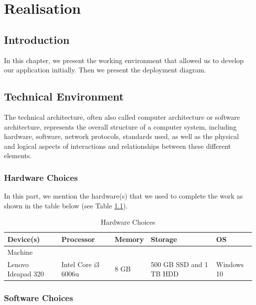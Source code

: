 \chapter{Realisation}
\section{Introduction}

In this chapter, we present the working environment that allowed us to develop our application initially. Then we present the deployment diagram.

\section{Technical Environment}

The technical architecture, often also called computer architecture or software architecture, represents the overall structure of a computer system, including hardware, software, network protocols, standards used, as well as the physical and logical aspects of interactions and relationships between these different elements.

\subsection{Hardware Choices}

In this part, we mention the hardware(s) that we used to complete the work as shown in the table below (see Table \ref{tab:hardware-choices}).
\begin{table}[htbp]
    \centering
    
    \begin{tabular}{|p{2cm}|p{3cm}|p{2cm}|p{4cm}|p{2cm}|}
        \hline
        \rowcolor{purple!20} %
        Device(s) & Processor & Memory & Storage & OS \\
        \hline
        Machine & & & & \\
        Lenovo Ideapad 320  & Intel Core i3 6006u & 8 GB & 500 GB SSD and  1 TB HDD & Windows 10\\
        \hline
       \end{tabular}
       \caption{Hardware Choices}
    \label{tab:hardware-choices}
\end{table}

\subsection{Software Choices}


